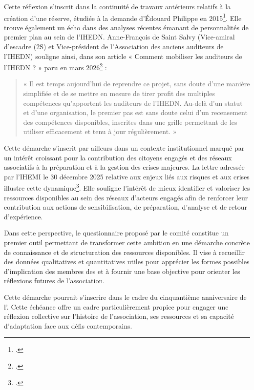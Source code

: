 Cette réflexion s'inscrit dans la continuité de travaux antérieurs relatifs à la création d'une réserve, étudiée à la demande d'Édouard Philippe en 2015\footcite{DESAINTSALVY2026}. Elle trouve également un écho dans des analyses récentes émanant de personnalités de premier plan au sein de l'IHEDN. Anne-François de Saint Salvy (Vice-amiral d'escadre (2S) et Vice-président de l'Association des anciens auditeurs de l'IHEDN) souligne ainsi, dans son article « Comment mobiliser les auditeurs de l'IHEDN ? » paru en mars 2026\footcite{DESAINTSALVY2026} :

\begin{quote}
« Il est temps aujourd'hui de reprendre ce projet, sans doute d'une manière simplifiée et de se mettre en mesure de tirer profit des multiples compétences qu'apportent les auditeurs de l'IHEDN. Au-delà d'un statut et d'une organisation, le premier pas est sans doute celui d'un recensement des compétences disponibles, inscrites dans une grille permettant de les utiliser efficacement et tenu à jour régulièrement. »
\end{quote}

Cette démarche s'inscrit par ailleurs dans un contexte institutionnel marqué par un intérêt croissant pour la contribution des citoyens engagés et des réseaux associatifs à la préparation et à la gestion des crises majeures. La lettre adressée par l'IHEMI le 30 décembre 2025 relative aux enjeux liés aux risques et aux crises illustre cette dynamique\footcite{IHEMI:2025:LIREC75}. Elle souligne l'intérêt de mieux identifier et valoriser les ressources disponibles au sein des réseaux d'acteurs engagés afin de renforcer leur contribution aux actions de sensibilisation, de préparation, d'analyse et de retour d'expérience.

Dans cette perspective, le questionnaire proposé par le comité constitue un premier outil permettant de transformer cette ambition en une démarche concrète de connaissance et de structuration des ressources disponibles. Il vise à recueillir des données qualitatives et quantitatives utiles pour apprécier les formes possibles d'implication des membres des \AssociationsUnionIHEDN et à fournir une base objective pour orienter les réflexions futures de l'association.

Cette démarche pourrait s'inscrire dans le cadre du cinquantième anniversaire de l'\UnionIHEDN. Cette échéance offre un cadre particulièrement propice pour engager une réflexion collective sur l'histoire de l'association, ses ressources et sa capacité d'adaptation face aux défis contemporains.


